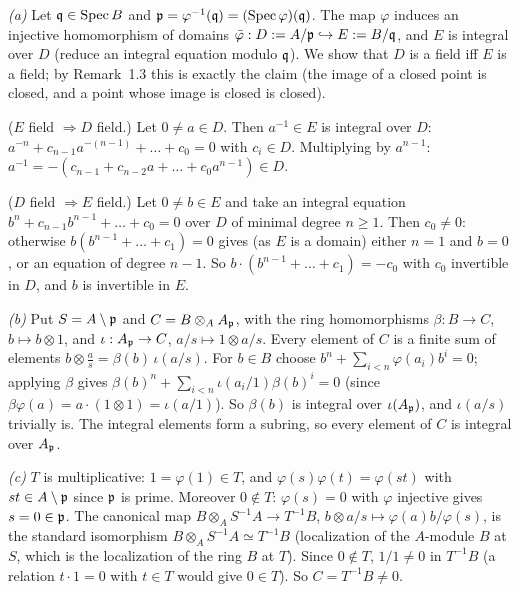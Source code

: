 \documentclass[11pt]{article}
\begin{document}
\pf
\emph{(a)} Let $\mathfrak q\in\operatorname{Spec} B$ and $\mathfrak p=\varphi^{-1}(\mathfrak q)=(\operatorname{Spec}\varphi)(\mathfrak q)$. The map $\varphi$ induces an injective homomorphism of domains $\bar\varphi:D:=A/\mathfrak p\hookrightarrow E:=B/\mathfrak q$, and $E$ is integral over $D$ (reduce an integral equation modulo $\mathfrak q$). We show that $D$ is a field iff $E$ is a field; by Remark~1.3 this is exactly the claim (the image of a closed point is closed, and a point whose image is closed is closed).

($E$ field $\Rightarrow D$ field.) Let $0\neq a\in D$. Then $a^{-1}\in E$ is integral over $D$: $a^{-n}+c_{n-1}a^{-(n-1)}+\dots+c_0=0$ with $c_i\in D$. Multiplying by $a^{n-1}$: $a^{-1}=-(c_{n-1}+c_{n-2}a+\dots+c_0a^{n-1})\in D$.

($D$ field $\Rightarrow E$ field.) Let $0\neq b\in E$ and take an integral equation $b^n+c_{n-1}b^{n-1}+\dots+c_0=0$ over $D$ of minimal degree $n\ge1$. Then $c_0\neq0$: otherwise $b(b^{n-1}+\dots+c_1)=0$ gives (as $E$ is a domain) either $n=1$ and $b=0$, or an equation of degree $n-1$. So $b\cdot(b^{n-1}+\dots+c_1)=-c_0$ with $c_0$ invertible in $D$, and $b$ is invertible in $E$.

\emph{(b)} Put $S=A\setminus\mathfrak p$ and $C=B\otimes_AA_\mathfrak p$, with the ring homomorphisms $\beta:B\to C$, $b\mapsto b\otimes1$, and $\iota:A_\mathfrak p\to C$, $a/s\mapsto1\otimes a/s$. Every element of $C$ is a finite sum of elements $b\otimes\frac as=\beta(b)\,\iota(a/s)$. For $b\in B$ choose $b^n+\sum_{i<n}\varphi(a_i)b^i=0$; applying $\beta$ gives $\beta(b)^n+\sum_{i<n}\iota(a_i/1)\beta(b)^i=0$ (since $\beta\varphi(a)=a\cdot(1\otimes 1)=\iota(a/1)$). So $\beta(b)$ is integral over $\iota(A_\mathfrak p)$, and $\iota(a/s)$ trivially is. The integral elements form a subring, so every element of $C$ is integral over $A_\mathfrak p$.

\emph{(c)} $T$ is multiplicative: $1=\varphi(1)\in T$, and $\varphi(s)\varphi(t)=\varphi(st)$ with $st\in A\setminus\mathfrak p$ since $\mathfrak p$ is prime. Moreover $0\notin T$: $\varphi(s)=0$ with $\varphi$ injective gives $s=0\in\mathfrak p$. The canonical map $B\otimes_AS^{-1}A\to T^{-1}B$, $b\otimes a/s\mapsto\varphi(a)b/\varphi(s)$, is the standard isomorphism $B\otimes_AS^{-1}A\simeq T^{-1}B$ (localization of the $A$-module $B$ at $S$, which is the localization of the ring $B$ at $T$). Since $0\notin T$, $1/1\neq0$ in $T^{-1}B$ (a relation $t\cdot1=0$ with $t\in T$ would give $0\in T$). So $C=T^{-1}B\neq0$.
\end{document}
